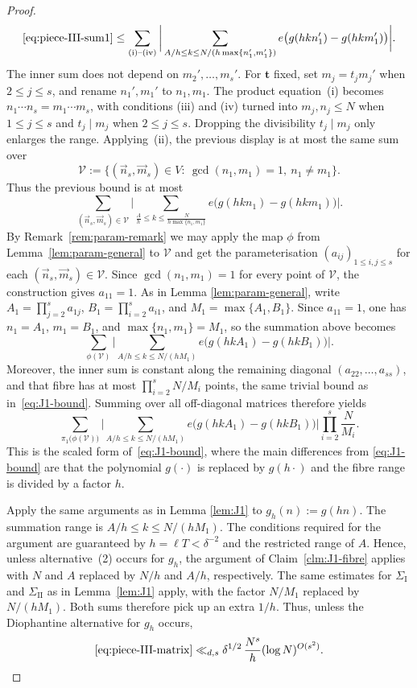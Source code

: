 \begin{proof}
\[
\eqref{eq:piece-III-sum1}
\leq
\sum_{\text{(i)--(iv)}}
\bigg|
\sum_{A/h\leq k\leq N/(h\max\{n_1',m_1'\})}
e\bigl(g(hkn_1')-g(hkm_1')\bigr)
\bigg|.
\]
The inner sum does not depend on $m_2',\ldots,m_s'$.
For $\mathbf t$ fixed, set $m_j=t_jm_j'$ when $2\leq j\leq s$, and rename $n_1',m_1'$ to $n_1,m_1$.
The product equation~(i) becomes $n_1\cdots n_s=m_1\cdots m_s$, with conditions (iii) and (iv) turned into $m_j,n_j\leq N$ when $1\leq j\leq s$ and $t_j\mid m_j$ when $2\leq j\leq s$.
Dropping the divisibility $t_j\mid m_j$ only enlarges the range. Applying~(ii), the previous display is at most the same sum over
\[
\mathscr{V}
:=\bigl\{
(\vec{n}_s,\vec{m}_s)\in V:\
\gcd(n_1,m_1)=1,\ n_1\neq m_1
\bigr\}.
\]
Thus the previous bound is at most
\[
\sum_{(\vec{n}_s,\vec{m}_s)\in\mathscr{V}}
\Biggl|
\sum_{\tfrac{A}{h}\leq k\leq\tfrac{N}{h\max\{n_1,m_1\}}}
e\bigl(g(hkn_1)-g(hkm_1)\bigr)
\Biggr|.
\]
By Remark~\ref{rem:param-remark} we may apply the map $\phi$ from Lemma~\ref{lem:param-general} to \(\mathscr{V}\) and get the parameterisation $(a_{ij})_{1\leq i,j\leq s}$ for each $(\vec{n}_s,\vec{m}_s)\in\mathscr{V}$.
Since \(\gcd(n_1,m_1)=1\) for every point of \(\mathscr{V}\), the construction gives \(a_{11}=1\).
As in Lemma \ref{lem:param-general}, write $A_1=\prod_{j=2}^s a_{1j}$, $B_1=\prod_{i=2}^s a_{i1}$, and $M_1=\max\{A_1,B_1\}$.
Since $a_{11}=1$, one has $n_1=A_1$, $m_1=B_1$, and $\max\{n_1,m_1\}=M_1$, so the summation above becomes
\[
\sum_{\phi(\mathscr{V})}
\Biggl|
\sum_{A/h\leq k\leq N/(hM_1)}
e\bigl(g(hkA_1)-g(hkB_1)\bigr)
\Biggr|.
\]
Moreover, the inner sum is constant along the remaining diagonal $(a_{22},\ldots,a_{ss})$, and that fibre has at most $\prod_{i=2}^s N/M_i$ points, the same trivial bound as in~\eqref{eq:J1-bound}.
Summing over all off-diagonal matrices therefore yields
\begin{equation}\label{eq:piece-III-matrix}
\sum_{\pi_1\bigl(\phi(\mathscr{V})\bigr)}
\Biggl|
\sum_{A/h\leq k\leq N/(hM_1)}
e\bigl(g(hkA_1)-g(hkB_1)\bigr)
\Biggr|
\prod_{i=2}^s\frac{N}{M_i}.
\end{equation}
This is the scaled form of~\eqref{eq:J1-bound}, where the main differences from \eqref{eq:J1-bound} are that the polynomial $g(\cdot)$ is replaced by $g(h\cdot)$ and the fibre range is divided by a factor $h$.

Apply the same arguments as in Lemma \ref{lem:J1} to
$g_h(n):=g(hn)$.  The summation range is $A/h\le k\le N/(hM_1)$.
The conditions required for the argument are guaranteed by $h=\ell T<\delta^{-2}$ and the restricted range of $A$.
Hence, unless alternative~(2) occurs for $g_h$, the argument of Claim~\ref{clm:J1-fibre} applies with $N$ and $A$ replaced by $N/h$ and $A/h$, respectively.
The same estimates for $\Sigma_{\mathrm I}$ and $\Sigma_{\mathrm{II}}$ as in Lemma~\ref{lem:J1} apply, with the factor $N/M_1$ replaced by $N/(hM_1)$.
Both sums therefore pick up an extra $1/h$.
Thus, unless the Diophantine alternative for $g_h$ occurs,
\begin{equation}\label{eq:piece-III-fixed}
\eqref{eq:piece-III-matrix}
\ll_{d,s} \delta^{1/2}\,\frac{N^s}{h}(\log N)^{O(s^2)}.
\end{equation}


\end{proof}
